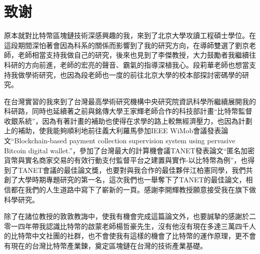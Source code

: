 
\chapter{致谢}
原本就對比特幣區塊鏈技術深感興趣的我，來到了北京大學攻讀工程碩士學位。在這段期間深怕著會因為科系的關係而影響到了我的研究方向，在導師雙選了劉京老師，老師相當支持我做自己的研究，後來也見到了李傑教授，大力鼓勵者我繼續往科研的方向前進，老師的宏亮的聲音、霸氣的指導深植我心。段莉華老師也想當支持我做學術研究，也因為段老師也一度的前往北京大學的校本部探討密碼學的研究。

在台灣實習的我來到了台灣最高學術研究機構中央研究院資訊科學所繼續展開我的科研路，同時也延續著之前與銘傳大學王家輝老師合作的科技部計畫“比特幣監督收銀系統”，因為有著計畫的補助也使得在求學的路上較無經濟壓力，也因為計劃上的補助，使我能夠順利地前往義大利羅馬參加IEEE WiMob會議發表論文“Blockchain-based payment collection supervision system using pervasive Bitcoin digital wallet.”，參加了台灣最大的計算機會議TANET發表論文“匿名加密貨幣與實名商家交易的有效行動支付監督平台之建置與實作-以比特幣為例”，也得到了TANET會議的最佳論文獎，也要對與我合作的最佳夥伴江柏憲同學，我們共創了大學時期專題研究的第一名，這次我們也一舉奪下了TANET的最佳論文，相信都在我們的人生道路中寫下了嶄新的一頁。感謝李開輝教授願意接受我在旗下做科學研究。

除了在諸位教授的敦敦教誨中，使我有機會完成這篇論文外，也要誠摯的感謝於二零一四年帶我認識比特幣的啟蒙老師楊哲豪先生，沒有他沒有現在多達三萬四千人的比特幣中文社團的社群，也不會使我有這樣的機會了比特幣的運作原理，更不會有現在的台灣比特幣產業鍊，奠定區塊鏈在台灣的技術產業基礎。
